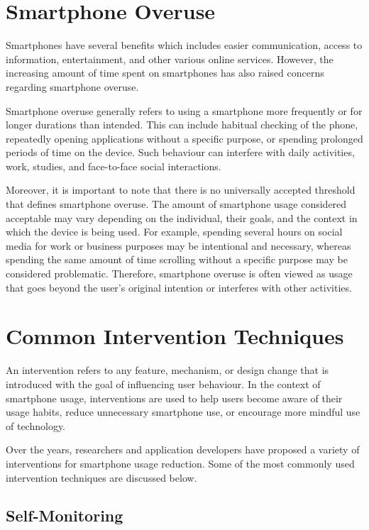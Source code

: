 \documentclass[11pt]{report}
\begin{document}
\section{Smartphone Overuse}

Smartphones have several benefits which includes easier communication, access to 
information, entertainment, and other various online services. However, the increasing 
amount of time spent on smartphones has also raised concerns regarding smartphone overuse.

Smartphone overuse generally refers to using a smartphone more frequently or for 
longer durations than intended. This can include habitual checking of the phone, 
repeatedly opening applications without a specific purpose, or spending prolonged 
periods of time on the device. Such behaviour can interfere with daily activities, 
work, studies, and face-to-face social interactions.

Moreover, it is important to note that there is no universally accepted threshold that 
defines smartphone overuse. The amount of smartphone usage considered acceptable may 
vary depending on the individual, their goals, and the context in which the device is 
being used. For example, spending several hours on social media for work or business 
purposes may be intentional and necessary, whereas spending the same amount of time 
scrolling without a specific purpose may be considered problematic. Therefore, 
smartphone overuse is often viewed as usage that goes beyond the user's original 
intention or interferes with other activities.

\section{Common Intervention Techniques}

An intervention refers to any feature, mechanism, or design change that is introduced 
with the goal of influencing user behaviour. In the context of smartphone usage, 
interventions are used to help users become aware of their usage habits, reduce 
unnecessary smartphone use, or encourage more mindful use of technology.

Over the years, researchers and application developers have proposed a variety of 
interventions for smartphone usage reduction. Some of the most commonly used intervention 
techniques are discussed below.

\subsection{Self-Monitoring}
\end{document}
